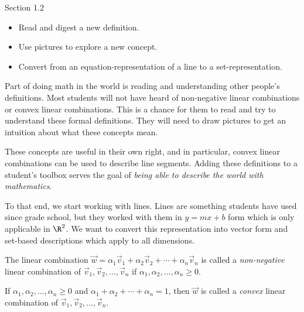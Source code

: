 \documentclass{problemset}
\newcommand{\displayonlynewpage}{\begin{displayonly}\newpage\end{displayonly}}
\begin{document}
\begin{lesson}

	 Section 1.2

	\begin{itemize}
		\item Read and digest a new definition.

		\item Use pictures to explore a new concept.

		\item Convert from an equation-representation of a line to a set-representation.
	\end{itemize}

	 Part of doing math in the world is reading and understanding
	other people's definitions. Most students will not have heard of non-negative
	linear combinations or convex linear combinations. This is a chance for them
	to read and try to understand these formal definitions. They will need to
	draw pictures to get an intuition about what these concepts mean.

	These concepts are useful in their own right, and in particular, convex linear
	combinations can be used to describe line segments. Adding these definitions
	to a student's toolbox serves the goal of \emph{being able to describe
	the world with mathematics}.

	To that end, we start working with lines. Lines are something students have
	used since grade school, but they worked with them in $y=mx+b$ form which
	is only applicable in $\R^{2}$. We want to convert this representation
	into vector form and set-based descriptions which apply to all
	dimensions.

\end{lesson}

	\displayonlynewpage
	\begin{definition}
		The linear combination $\vec w=\alpha_1\vec v_1+\alpha_2\vec v_2+\cdots+\alpha_n\vec v_n$ is
		called a \emph{non-negative} linear combination of $\vec v_1,\vec v_2,\ldots,\vec v_n$ if
		$\alpha_1,\alpha_2,\ldots,\alpha_n\geq 0$.

		If $\alpha_1,\alpha_2,\ldots,\alpha_n\geq 0$
		and $\alpha_1+\alpha_2+\cdots+\alpha_n=1$, then $\vec w$ is called a \emph{convex} linear combination
		of  $\vec v_1,\vec v_2,\ldots,\vec v_n$.
	\end{definition}
\end{document}
